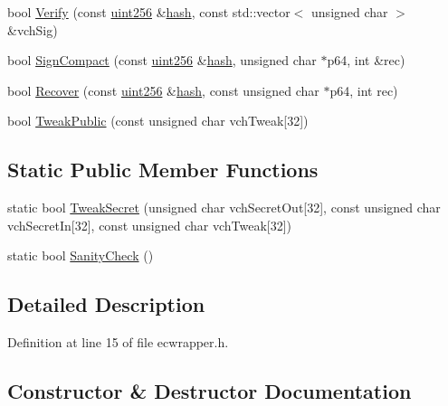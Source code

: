 \begin{DoxyCompactItemize}
\item 
bool \hyperlink{class_c_e_c_key_abbefe8d295d0bbed97d2709a3a534375}{Verify} (const \hyperlink{classuint256}{uint256} \&\hyperlink{cache_8cc_a11ecb029164e055f28f4123ce3748862}{hash}, const std\+::vector$<$ unsigned char $>$ \&vch\+Sig)
\item 
bool \hyperlink{class_c_e_c_key_ae7dae2b7062d1ba864c923e72fb5ede3}{Sign\+Compact} (const \hyperlink{classuint256}{uint256} \&\hyperlink{cache_8cc_a11ecb029164e055f28f4123ce3748862}{hash}, unsigned char $\ast$p64, int \&rec)
\item 
bool \hyperlink{class_c_e_c_key_a5d7ed3acdc6c2798af3242cacc7b755b}{Recover} (const \hyperlink{classuint256}{uint256} \&\hyperlink{cache_8cc_a11ecb029164e055f28f4123ce3748862}{hash}, const unsigned char $\ast$p64, int rec)
\item 
bool \hyperlink{class_c_e_c_key_a5f6013e6314a8ca9645a49106091ad89}{Tweak\+Public} (const unsigned char vch\+Tweak\mbox{[}32\mbox{]})
\end{DoxyCompactItemize}
\subsection*{Static Public Member Functions}
\begin{DoxyCompactItemize}
\item 
static bool \hyperlink{class_c_e_c_key_a5964ca5e2e3f7204c59613d2aedca165}{Tweak\+Secret} (unsigned char vch\+Secret\+Out\mbox{[}32\mbox{]}, const unsigned char vch\+Secret\+In\mbox{[}32\mbox{]}, const unsigned char vch\+Tweak\mbox{[}32\mbox{]})
\item 
static bool \hyperlink{class_c_e_c_key_a3d11821aa2328baf3bd684e5c1835314}{Sanity\+Check} ()
\end{DoxyCompactItemize}


\subsection{Detailed Description}


Definition at line 15 of file ecwrapper.\+h.



\subsection{Constructor \& Destructor Documentation}
\hypertarget{class_c_e_c_key_a5ee51ce7e5435b8d337913540947e58a}{}
